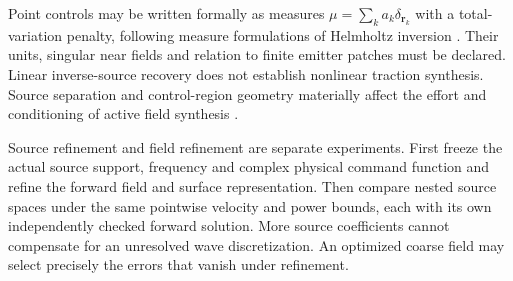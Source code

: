 Point controls may be written formally as measures
$\mu=\sum_k a_k\delta_{\bm r_k}$ with a total-variation penalty, following
measure formulations of Helmholtz inversion \cite{pieper2020}. Their units,
singular near fields and relation to finite emitter patches must be declared.
Linear inverse-source recovery does not establish nonlinear traction synthesis.
Source separation and control-region geometry materially affect the effort
and conditioning of active field synthesis \cite{hubenthal2016,egarguin2018}.

Source refinement and field refinement are separate experiments. First freeze
the actual source support, frequency and complex physical command function
and refine the forward field and surface representation. Then compare nested
source spaces under the same pointwise velocity and power bounds, each with
its own independently checked forward solution. More source coefficients
cannot compensate for an unresolved wave discretization. An optimized coarse
field may select precisely the errors that vanish under refinement.
